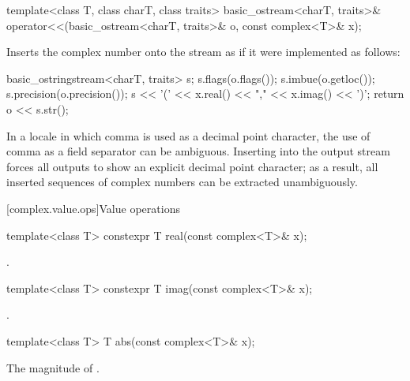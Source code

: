 %
\begin{itemdecl}
template<class T, class charT, class traits>
  basic_ostream<charT, traits>& operator<<(basic_ostream<charT, traits>& o, const complex<T>& x);
\end{itemdecl}

\begin{itemdescr}
\pnum
\effects
Inserts the complex number 
onto the stream  as if it were implemented as follows:
\begin{codeblock}
basic_ostringstream<charT, traits> s;
s.flags(o.flags());
s.imbue(o.getloc());
s.precision(o.precision());
s << '(' << x.real() << "," << x.imag() << ')';
return o << s.str();
\end{codeblock}

\pnum
\begin{note}
In a locale in which comma is used as a decimal point character, the
use of comma as a field separator can be ambiguous. Inserting
 into the output stream forces all outputs to
show an explicit decimal point character; as a result, all inserted sequences of
complex numbers can be extracted unambiguously.
\end{note}
\end{itemdescr}

[complex.value.ops]{Value operations}

%
\begin{itemdecl}
template<class T> constexpr T real(const complex<T>& x);
\end{itemdecl}

\begin{itemdescr}
\pnum
\returns
{}.
\end{itemdescr}

%
\begin{itemdecl}
template<class T> constexpr T imag(const complex<T>& x);
\end{itemdecl}

\begin{itemdescr}
\pnum
\returns
{}.
\end{itemdescr}

%
\begin{itemdecl}
template<class T> T abs(const complex<T>& x);
\end{itemdecl}

\begin{itemdescr}
\pnum
\returns
The magnitude of .
\end{itemdescr}

